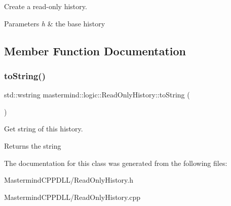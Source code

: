 Create a read-\/only history. 
\begin{DoxyParams}{Parameters}
{\em h} & the base history \\
\hline
\end{DoxyParams}


\subsection{Member Function Documentation}
\hypertarget{classmastermind_1_1logic_1_1_read_only_history_afb28dfc9cc7b169a7878bd7567979a36}{}\label{classmastermind_1_1logic_1_1_read_only_history_afb28dfc9cc7b169a7878bd7567979a36} 
\subsubsection{\texorpdfstring{to\+String()}{toString()}}
{\footnotesize\ttfamily std\+::wstring mastermind\+::logic\+::\+Read\+Only\+History\+::to\+String (\begin{DoxyParamCaption}{ }\end{DoxyParamCaption})}

Get string of this history. \begin{DoxyReturn}{Returns}
the string 
\end{DoxyReturn}


The documentation for this class was generated from the following files\+:\begin{DoxyCompactItemize}
\item 
Mastermind\+C\+P\+P\+D\+L\+L/Read\+Only\+History.\+h\item 
Mastermind\+C\+P\+P\+D\+L\+L/Read\+Only\+History.\+cpp\end{DoxyCompactItemize}
